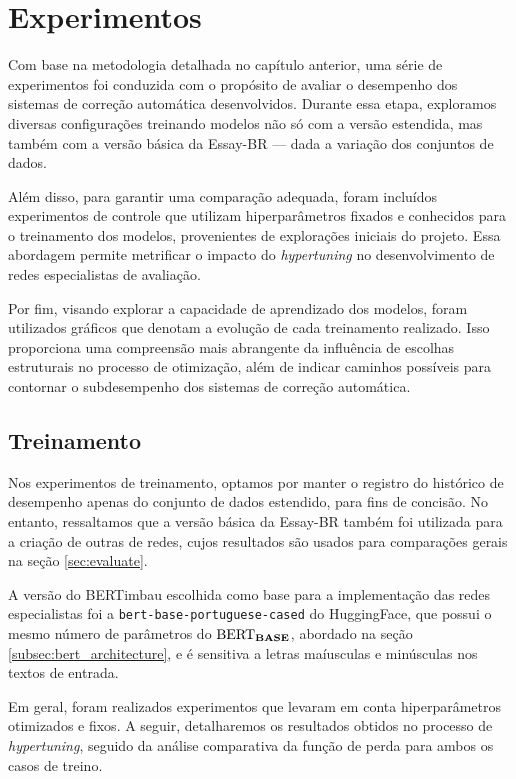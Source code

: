 \chapter{Experimentos}
\label{chap:experiments}

Com base na metodologia detalhada no capítulo anterior, uma série de experimentos foi conduzida com o propósito de avaliar o desempenho dos sistemas de correção automática desenvolvidos. Durante essa etapa, exploramos diversas configurações treinando modelos não só com a versão estendida, mas também com a versão básica da Essay-BR --- dada a variação dos conjuntos de dados.

Além disso, para garantir uma comparação adequada, foram incluídos experimentos de controle que utilizam hiperparâmetros fixados e conhecidos para o treinamento dos modelos, provenientes de explorações iniciais do projeto. Essa abordagem permite metrificar o impacto do \textit{hypertuning} no desenvolvimento de redes especialistas de avaliação.

Por fim, visando explorar a capacidade de aprendizado dos modelos, foram utilizados gráficos que denotam a evolução de cada treinamento realizado. Isso proporciona uma compreensão mais abrangente da influência de escolhas estruturais no processo de otimização, além de indicar caminhos possíveis para contornar o subdesempenho dos sistemas de correção automática.

\section{Treinamento}

Nos experimentos de treinamento, optamos por manter o registro do histórico de desempenho apenas do conjunto de dados estendido, para fins de concisão. No entanto, ressaltamos que a versão básica da Essay-BR também foi utilizada para a criação de outras de redes, cujos resultados são usados para comparações gerais na seção \ref{sec:evaluate}.

A versão do BERTimbau escolhida como base para a implementação das redes especialistas foi a \texttt{bert-base-portuguese-cased} do HuggingFace, que possui o mesmo número de parâmetros do $\text{BERT}_{\textbf{\text{BASE}}}$, abordado na seção \ref{subsec:bert_architecture}, e é sensitiva a letras maíusculas e minúsculas nos textos de entrada.

Em geral, foram realizados experimentos que levaram em conta hiperparâmetros otimizados e fixos. A seguir, detalharemos os resultados obtidos no processo de \textit{hypertuning}, seguido da análise comparativa da função de perda para ambos os casos de treino.

